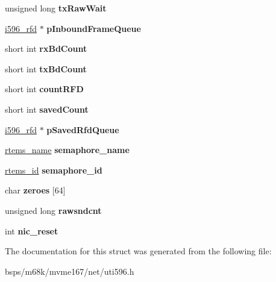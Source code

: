 \begin{DoxyCompactItemize}
unsigned long {\bfseries tx\+Raw\+Wait}
\item 
\mbox{\label{structuti596__softc_a2e492d94cdea625693e1a6c2f98e2974}} 
\mbox{\hyperlink{structi596__rfd}{i596\+\_\+rfd}} $\ast$ {\bfseries p\+Inbound\+Frame\+Queue}
\item 
\mbox{\label{structuti596__softc_a72a6179dd4d34f998a61c33aa619d017}} 
short int {\bfseries rx\+Bd\+Count}
\item 
\mbox{\label{structuti596__softc_a49d23c43496b279f9adca183bd1d05d8}} 
short int {\bfseries tx\+Bd\+Count}
\item 
\mbox{\label{structuti596__softc_ad7360191665b4dfc4416f737001a3292}} 
short int {\bfseries count\+R\+FD}
\item 
\mbox{\label{structuti596__softc_ae9dbeb8798e21040f6d5389889e94c13}} 
short int {\bfseries saved\+Count}
\item 
\mbox{\label{structuti596__softc_af1d683ccd5caea836952e36038ccd004}} 
\mbox{\hyperlink{structi596__rfd}{i596\+\_\+rfd}} $\ast$ {\bfseries p\+Saved\+Rfd\+Queue}
\item 
\mbox{\label{structuti596__softc_a247aeb7dd223db5846ce57f045d8a9fc}} 
\mbox{\hyperlink{group__ClassicTasks_ga55fb63c49f68c0cbd9bee004da15b1fd}{rtems\+\_\+name}} {\bfseries semaphore\+\_\+name}
\item 
\mbox{\label{structuti596__softc_a7392c82b3b62b63d1d5ac0f5ea47da86}} 
\mbox{\hyperlink{group__ClassicTasks_gab20892b814dced7dd4e5b9bf42becd57}{rtems\+\_\+id}} {\bfseries semaphore\+\_\+id}
\item 
\mbox{\label{structuti596__softc_a023a5b701787e33b63bfc68f7986ff72}} 
char {\bfseries zeroes} \mbox{[}64\mbox{]}
\item 
\mbox{\label{structuti596__softc_acca621d085a87015ddb910cf69297b58}} 
unsigned long {\bfseries rawsndcnt}
\item 
\mbox{\label{structuti596__softc_a159af1a2deb5742c892b35975559bdad}} 
int {\bfseries nic\+\_\+reset}
\end{DoxyCompactItemize}


The documentation for this struct was generated from the following file\+:\begin{DoxyCompactItemize}
\item 
bsps/m68k/mvme167/net/uti596.\+h\end{DoxyCompactItemize}
